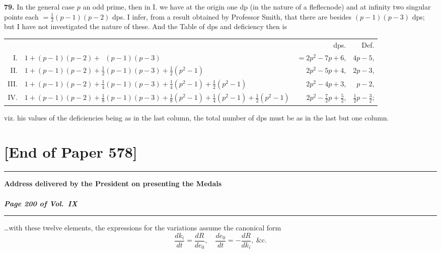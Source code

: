 \documentclass[12pt,a4paper]{article}
\begin{document}
\textbf{79.} In the general case $p$ an odd prime, then in I. we have at the origin one dp (in the nature of a fleflecnode) and at infinity two singular points each $= \frac{1}{2}(p - 1)(p - 2)$ dps. I infer, from a result obtained by Professor Smith, that there are besides $(p - 1)(p - 3)$ dps; but I have not investigated the nature of these. And the Table of dps and deficiency then is
\begin{center}
\begin{tabular}{r@{\quad}l@{\quad}r@{\quad}r}
& & dps. & Def. \\
I. & $1 + (p-1)(p-2) + \phantom{\frac{1}{2}}(p-1)(p-3)$ &
$= 2p^2 - 7p + 6$, & $4p - 5$, \\
II. & $1 + (p-1)(p-2) + \frac{1}{2}(p-1)(p-3) + \frac{1}{2}(p^2 - 1)$ &
$2p^2 - 5p + 4$, & $2p - 3$, \\
III. & $1 + (p-1)(p-2) + \frac{1}{4}(p-1)(p-3) + \frac{1}{4}(p^2 - 1) + \frac{1}{2}(p^2 - 1)$ &
$2p^2 - 4p + 3$, & $p - 2$, \\
IV. & $1 + (p-1)(p-2) + \frac{1}{8}(p-1)(p-3) + \frac{1}{8}(p^2 - 1) + \frac{1}{4}(p^2 - 1) + \frac{1}{2}(p^2 - 1)$ &
$2p^2 - \frac{7}{2}p + \frac{5}{2}$, & $\frac{1}{2}p - \frac{3}{2}$;
\end{tabular}
\end{center}
viz. his values of the deficiencies being as in the last column, the total number of dps must be as in the last but one column.

\newpage
\section*{[End of Paper 578]}

\vspace{2em}
\noindent\rule{\textwidth}{0.4pt}




\newpage
\begin{center}
\Large\bfseries Address delivered by the President on presenting the Medals\\[0.3em]
\normalsize\mdseries [Paper 579]\\[0.3em]
\textit{Page 200 of Vol.~IX}
\end{center}

\noindent\rule{\textwidth}{0.4pt}

\medskip

\ldots with these twelve elements, the expressions for the variations assume the canonical form
\[
\frac{dk_i}{dt} = \frac{dR}{de_0}, \quad \frac{de_0}{dt} = -\frac{dR}{dk_i}, \ \&\text{c.}
\]
\end{document}

